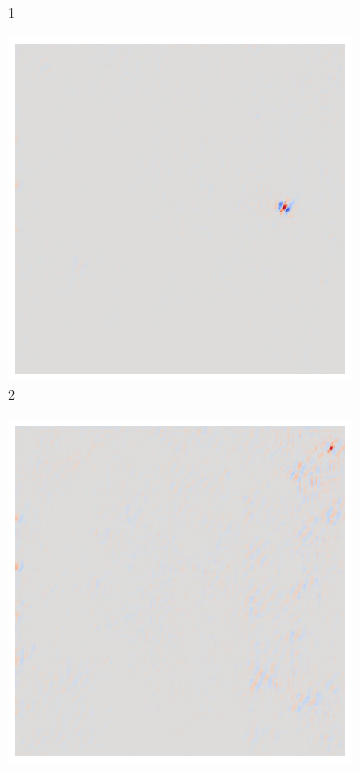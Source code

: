 \begin{figure}[ht!]
\begin{subfigure}{0.095\linewidth}
        \caption{1}
    \end{subfigure}\hfill%
    \begin{subfigure}{0.095\linewidth}
        \centering
        \includegraphics[height=1\linewidth]{01-images/05-resultate/uap_resnet/uap0-resnet18-covid-n200-robustificationslevel2.png}
        \caption{2}
    \end{subfigure}\hfill%
    \begin{subfigure}{0.095\linewidth}
        \centering
        \includegraphics[height=1\linewidth]{01-images/05-resultate/uap_resnet/uap0-resnet18-covid-n200-robustificationslevel3.png}

\end{subfigure}
\end{figure}
